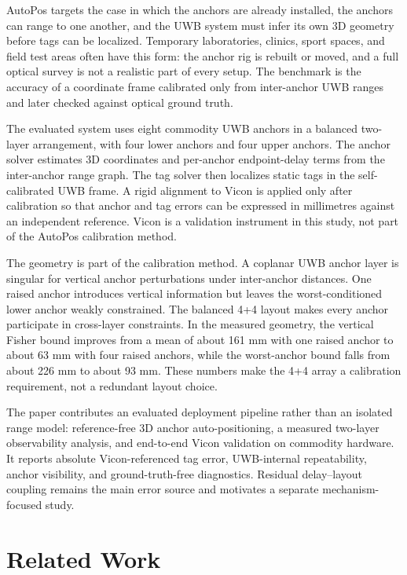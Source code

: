 \documentclass[journal,twoside,web]{ieeecolor}
\begin{document}
AutoPos targets the case in which the anchors are already installed, the anchors can range to one another, and the UWB system must infer its own 3D geometry before tags can be localized. Temporary laboratories, clinics, sport spaces, and field test areas often have this form: the anchor rig is rebuilt or moved, and a full optical survey is not a realistic part of every setup. The benchmark is the accuracy of a coordinate frame calibrated only from inter-anchor UWB ranges and later checked against optical ground truth.

The evaluated system uses eight commodity UWB anchors in a balanced two-layer arrangement, with four lower anchors and four upper anchors. The anchor solver estimates 3D coordinates and per-anchor endpoint-delay terms from the inter-anchor range graph. The tag solver then localizes static tags in the self-calibrated UWB frame. A rigid alignment to Vicon is applied only after calibration so that anchor and tag errors can be expressed in millimetres against an independent reference. Vicon is a validation instrument in this study, not part of the AutoPos calibration method.

The geometry is part of the calibration method. A coplanar UWB anchor layer is singular for vertical anchor perturbations under inter-anchor distances. One raised anchor introduces vertical information but leaves the worst-conditioned lower anchor weakly constrained. The balanced 4+4 layout makes every anchor participate in cross-layer constraints. In the measured geometry, the vertical Fisher bound improves from a mean of about 161 mm with one raised anchor to about 63 mm with four raised anchors, while the worst-anchor bound falls from about 226 mm to about 93 mm. These numbers make the 4+4 array a calibration requirement, not a redundant layout choice.

The paper contributes an evaluated deployment pipeline rather than an isolated range model: reference-free 3D anchor auto-positioning, a measured two-layer observability analysis, and end-to-end Vicon validation on commodity hardware. It reports absolute Vicon-referenced tag error, UWB-internal repeatability, anchor visibility, and ground-truth-free diagnostics. Residual delay--layout coupling remains the main error source and motivates a separate mechanism-focused study.

\section{Related Work}
\label{sec:related}
\end{document}
